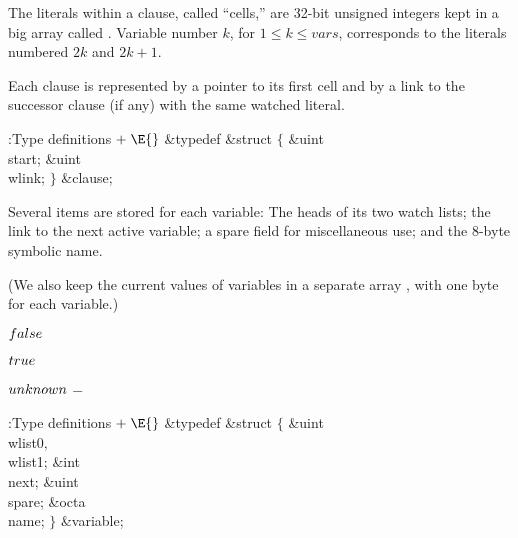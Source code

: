 The literals within a clause, called ``cells,'' are 32-bit unsigned
integers kept in a big array called . Variable number $k$,
for $1\le k\le vars$, corresponds to the literals numbered $2k$ and $2k+1$.

Each clause is represented by a pointer to its first cell and by a link
to the successor clause (if any) with the same watched literal.

\Y\B\4:Type definitions\X${}\mathrel+\E{}$\6
\&{typedef} \&{struct} ${}\{{}$\1\6
\&{uint} \\{start};\6
\&{uint} \\{wlink};\2\6
${}\}{}$ \&{clause};\par
\fi

Several items are stored for each variable: The heads of its
two watch lists; the link to the next active variable; a spare field
for miscellaneous use; and the 8-byte symbolic name.

(We also keep the current values of variables in a separate array ,
with
one byte for each variable.)

\Y\B\4\D$\\{false}$ \5
\par
\B\4\D$\\{true}$ \5
\par
\B\4\D$\\{unknown}$ \5
${-}{}$\par
\Y\B\4:Type definitions\X${}\mathrel+\E{}$\6
\&{typedef} \&{struct} ${}\{{}$\1\6
\&{uint} \\{wlist0}${},{}$ \\{wlist1};\6
\&{int} \\{next};\6
\&{uint} \\{spare};%
\6
\&{octa} \\{name};\2\6
${}\}{}$ \&{variable};\par
\fi

